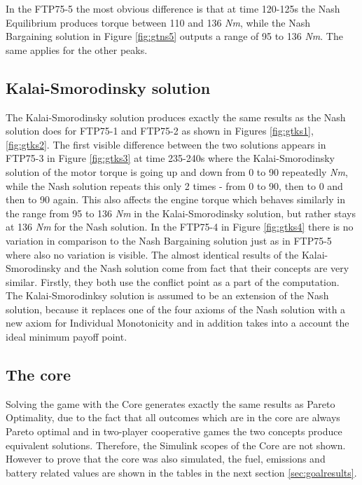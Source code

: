 In the FTP75-5 the most obvious difference is that at time 120-125s the Nash Equilibrium produces torque between 110 and 136 \textit{Nm}, while the Nash Bargaining solution in Figure \ref{fig:gtns5} outputs a range of 95 to 136 \textit{Nm}. The same applies for the other peaks.

\subsection{Kalai-Smorodinsky solution}
The Kalai-Smorodinsky solution produces exactly the same results as the Nash solution does for FTP75-1 and FTP75-2 as shown in Figures \ref{fig:gtks1}, \ref{fig:gtks2}. The first visible difference between the two solutions appears in FTP75-3 in Figure \ref{fig:gtks3} at time 235-240s where the Kalai-Smorodinsky solution of the motor torque is going up and down from 0 to 90 repeatedly \textit{Nm}, while the Nash solution repeats this only 2 times - from 0 to 90, then to 0 and then to 90 again. This also affects the engine torque which behaves similarly in the range from 95 to 136 \textit{Nm} in the Kalai-Smorodinsky solution, but rather stays at 136 \textit{Nm} for the Nash solution. In the FTP75-4 in Figure \ref{fig:gtks4} there is no variation in comparison to the Nash Bargaining solution just as in FTP75-5 where also no variation is visible. The almost identical results of the Kalai-Smorodinsky and the Nash solution come from fact that their concepts are very similar. Firstly, they both use the conflict point as a part of the computation. The Kalai-Smorodinksy solution is assumed to be an extension of the Nash solution, because it replaces one of the four axioms of the Nash solution with a new axiom for Individual Monotonicity and in addition takes into a account the ideal minimum payoff point.

\subsection{The core}
Solving the game with the Core generates exactly the same results as Pareto Optimality, due to the fact that all outcomes which are in the core are always Pareto optimal and in two-player cooperative games the two concepts produce equivalent solutions. Therefore, the Simulink scopes of the Core are not shown. However to prove that the core was also simulated, the fuel, emissions and battery related values are shown in the tables in the next section \ref{sec:goalresults}.

